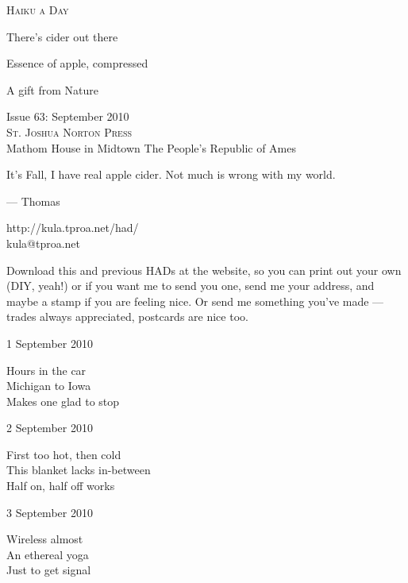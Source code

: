 \documentclass[12pt]{article}
\begin{document}
\begin{center}
{\fontsize{36}{48}\selectfont \textsc{Haiku a Day }}
\end{center}

\vspace*{3.5cm}

{\fontsize{20}{40}\selectfont 
There's cider out there

Essence of apple, compressed

A gift from Nature


}

\vspace*{5.0cm}
\begin{center}
{\large{Issue 63: September 2010}} \\[5mm]
{\fontsize{8}{8}\selectfont  \textsc{ St. Joshua Norton Press }} \\[1mm]
{\fontsize{6}{6}\selectfont Mathom House in Midtown \textbar The People's Republic of Ames }
\end{center}


\newpage

It's Fall, I have real apple cider. Not much is wrong with my world.

--- Thomas

http://kula.tproa.net/had/ \\
kula@tproa.net

Download this and previous HADs at the website, so you can
print out your own (DIY, yeah!) or if you want me to send
you one, send me your address, and maybe a stamp if you
are feeling nice. Or send me something you've made ---
trades always appreciated, postcards are nice too.

\vspace*{2.5cm}

1 September 2010

Hours in the car \\
Michigan to Iowa \\
Makes one glad to stop

2 September 2010

First too hot, then cold \\
This blanket lacks in-between \\
Half on, half off works

\newpage

3 September 2010

Wireless almost \\
An ethereal yoga \\
Just to get signal
\end{document}
